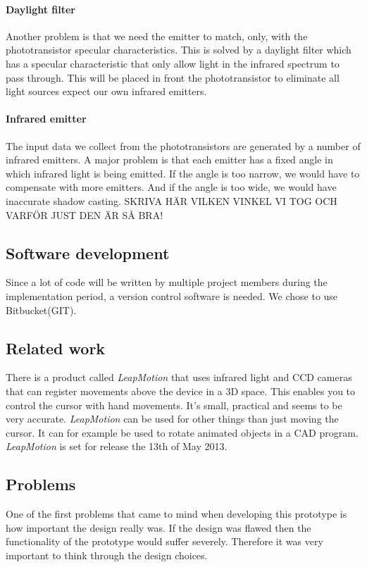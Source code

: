 \documentclass[a4paper,11pt]{article}
\begin{document}
\paragraph{Daylight filter}
Another problem is that we need the emitter to match, only, with the phototransistor 
specular characteristics. This is solved by a daylight filter which has a specular 
characteristic that only allow light in the infrared spectrum to pass through. This 
will be placed in front the phototransistor to eliminate all light sources expect our 
own infrared emitters.

\paragraph{Infrared emitter}
The input data we collect from the phototransistors are generated by a number of infrared 
emitters. A major problem is that each emitter has a fixed angle in which infrared light is 
being emitted. If the angle is too narrow, we would have to compensate with more emitters. 
And if the angle is too wide, we would have inaccurate shadow casting. 
SKRIVA HÄR VILKEN VINKEL VI TOG OCH VARFÖR JUST DEN ÄR SÅ BRA!

\subsection{Software development}
Since a lot of code will be written by multiple project members during the 
implementation period,  a version control software is needed. We chose to use Bitbucket(GIT).

\subsection{Related work}
There is a product called \emph{LeapMotion} that uses infrared light and CCD cameras that can
register movements above the device in a 3D space. This enables you to control the cursor with
hand movements. It's small, practical and seems to be very accurate. \emph{LeapMotion} can be
used for other things than just moving the cursor. It can for example be used to rotate animated
objects in a CAD program.\\
\emph{LeapMotion} is set for release the 13th of May 2013.

\subsection{Problems}
One of the first problems that came to mind when developing this prototype is how important 
the design really was. If the design was flawed then the functionality of the prototype would 
suffer severely. Therefore it was very important to think through the design choices.\\
\end{document}
